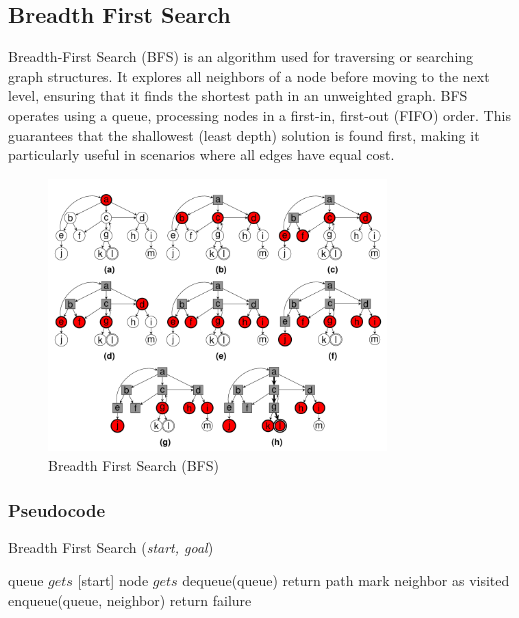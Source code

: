 \subsection{Breadth First Search}
\noindent Breadth-First Search (BFS) is an algorithm used for traversing or searching graph structures. It explores all neighbors of a node before moving to the next level, ensuring that it finds the shortest path in an unweighted graph. BFS operates using a queue, processing nodes in a first-in, first-out (FIFO) order. This guarantees that the shallowest (least depth) solution is found first, making it particularly useful in scenarios where all edges have equal cost.

\begin{figure}[H]
	\centering
	\includegraphics[width=0.8\textwidth]{./imgs/bfs.png}
	\caption{Breadth First Search (BFS)}
\end{figure}

\subsubsection{Pseudocode}
\begin{algorithm}[H]
	\caption{Breadth First Search (\textit{start, goal})}\label{alg:bfs}
	\begin{algorithmic}[1]
		\State queue \(gets\) [start]
		\State node \(gets\) dequeue(queue)
		\State return path
		\EndIf
		\State mark neighbor as visited
		\State enqueue(queue, neighbor)
		\EndIf
		\EndFor
		\EndWhile
		\State return failure
	\end{algorithmic}
\end{algorithm}

